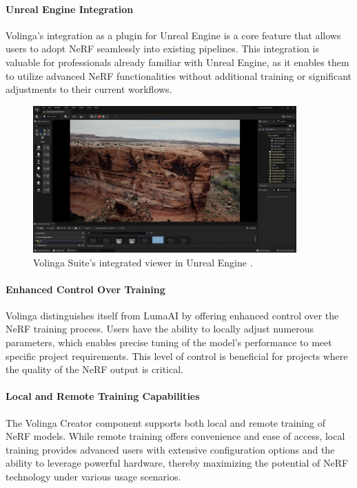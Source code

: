 \paragraph{Unreal Engine Integration}
Volinga's integration as a plugin for Unreal Engine \cite{noauthor_unreal_nodate} is a core feature that allows users to adopt NeRF seamlessly into existing pipelines.
This integration is valuable for professionals already familiar with Unreal Engine, as it enables them to utilize advanced NeRF functionalities without additional training or significant adjustments to their current workflows.

\begin{figure}[h!]
  \centering
  \includegraphics[width=0.9\textwidth]{figures/related-volinga.png}
  \caption{Volinga Suite's integrated viewer in Unreal Engine \cite{noauthor_volinga_nodate}.}
  \label{fig:volinga-viewer}
\end{figure}

\paragraph{Enhanced Control Over Training}
Volinga distinguishes itself from LumaAI by offering enhanced control over the NeRF training process.
Users have the ability to locally adjust numerous parameters, which enables precise tuning of the model's performance to meet specific project requirements.
This level of control is beneficial for projects where the quality of the NeRF output is critical.

\paragraph{Local and Remote Training Capabilities}
The Volinga Creator component supports both local and remote training of NeRF models.
While remote training offers convenience and ease of access, local training provides advanced users with extensive configuration options and the ability to leverage powerful hardware, thereby maximizing the potential of NeRF technology under various usage scenarios.

